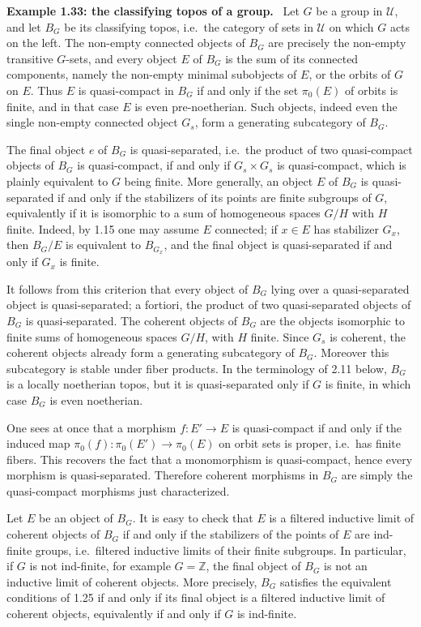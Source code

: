 \documentclass[11pt]{article}
\newcommand{\U}{\mathcal{U}}
\newcommand{\ie}{i.e.\ }
\newenvironment{remarktext}[1]{\par\medskip\noindent\textbf{#1.}\ }{\par\medskip}
\begin{document}
\begin{remarktext}{Example 1.33: the classifying topos of a group}
Let \(G\) be a group in \(\U\), and let \(B_G\) be its classifying topos, \ie the category of sets in \(\U\) on which \(G\) acts on the left. The non-empty connected objects of \(B_G\) are precisely the non-empty transitive \(G\)-sets, and every object \(E\) of \(B_G\) is the sum of its connected components, namely the non-empty minimal subobjects of \(E\), or the orbits of \(G\) on \(E\). Thus \(E\) is quasi-compact in \(B_G\) if and only if the set \(\pi_0(E)\) of orbits is finite, and in that case \(E\) is even pre-noetherian. Such objects, indeed even the single non-empty connected object \(G_s\), form a generating subcategory of \(B_G\).

The final object \(e\) of \(B_G\) is quasi-separated, \ie the product of two quasi-compact objects of \(B_G\) is quasi-compact, if and only if \(G_s\times G_s\) is quasi-compact, which is plainly equivalent to \(G\) being finite. More generally, an object \(E\) of \(B_G\) is quasi-separated if and only if the stabilizers of its points are finite subgroups of \(G\), equivalently if it is isomorphic to a sum of homogeneous spaces \(G/H\) with \(H\) finite. Indeed, by 1.15 one may assume \(E\) connected; if \(x\in E\) has stabilizer \(G_x\), then \(B_G/E\) is equivalent to \(B_{G_x}\), and the final object is quasi-separated if and only if \(G_x\) is finite.

It follows from this criterion that every object of \(B_G\) lying over a quasi-separated object is quasi-separated; a fortiori, the product of two quasi-separated objects of \(B_G\) is quasi-separated. The coherent objects of \(B_G\) are the objects isomorphic to finite sums of homogeneous spaces \(G/H\), with \(H\) finite. Since \(G_s\) is coherent, the coherent objects already form a generating subcategory of \(B_G\). Moreover this subcategory is stable under fiber products. In the terminology of 2.11 below, \(B_G\) is a locally noetherian topos, but it is quasi-separated only if \(G\) is finite, in which case \(B_G\) is even noetherian.

One sees at once that a morphism \(f:E'\to E\) is quasi-compact if and only if the induced map \(\pi_0(f):\pi_0(E')\to\pi_0(E)\) on orbit sets is proper, \ie has finite fibers. This recovers the fact that a monomorphism is quasi-compact, hence every morphism is quasi-separated. Therefore coherent morphisms in \(B_G\) are simply the quasi-compact morphisms just characterized.

Let \(E\) be an object of \(B_G\). It is easy to check that \(E\) is a filtered inductive limit of coherent objects of \(B_G\) if and only if the stabilizers of the points of \(E\) are ind-finite groups, \ie filtered inductive limits of their finite subgroups. In particular, if \(G\) is not ind-finite, for example \(G=\mathbb{Z}\), the final object of \(B_G\) is not an inductive limit of coherent objects. More precisely, \(B_G\) satisfies the equivalent conditions of 1.25 if and only if its final object is a filtered inductive limit of coherent objects, equivalently if and only if \(G\) is ind-finite.
\end{remarktext}
\end{document}
